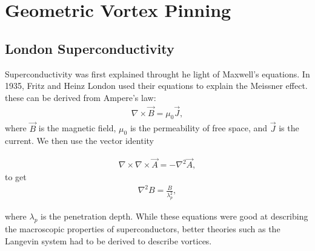 \chapter{Geometric Vortex Pinning}
\label{theoryvortex}

\section{London Superconductivity}
Superconductivity was first explained throught he light of Maxwell's equations. In 1935, Fritz and Heinz London used their equations to explain the Meissner effect. these can be derived from Ampere's law:
\begin{eqnarray}
\nabla \times \overrightarrow B  = \mu_0 \overrightarrow J,
\label{Ampere}
\end{eqnarray}
where $\overrightarrow B$ is the magnetic field, $\mu_0$ is the permeability of free space, and $\overrightarrow J$ is the current. We then use the vector identity

\begin{eqnarray}
\nabla \times \nabla \times \overrightarrow A  = -\nabla^2 \overrightarrow A,
\label{stokes}
\end{eqnarray}
to get
\begin{eqnarray}
\nabla^2 B = \frac{B}{\lambda_p^2},
\label{penetration}
\end{eqnarray}

where $\lambda_p$ is the penetration depth. While these equations were good at describing the macroscopic properties of superconductors, better theories such as the Langevin system had to be derived to describe vortices. 

